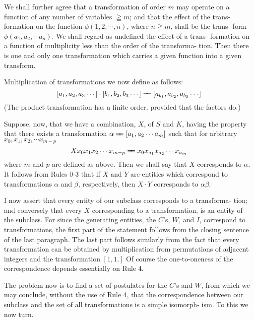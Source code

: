 \documentclass[10pt, twoside]{extarticle}
\def\varequals#1{\mathrel{\leaders\hbox to3pt{$=$\hss}\hskip#1=}}
\newcommand\longeq{\varequals{0.4em}}
\theoremstyle{breaktheorem}
\theoremstyle{mylemma}
\theoremstyle{mydefinition}
\theoremstyle{mycorollary}
\begin{document}
We shall further agree that a transformation of order \(m\) may operate on
a function of any number of variables \(\geqq m\); and that the effect of the trans-
formation on the function \(\phi(1, 2, \cdots, n)\), where \(n \geqq m\), shall be the trans-
form \(\phi(a_1, a_2, \cdots a_n)\). We shall regard as undefined the effect of a trans-
formation on a function of multiplicity less than the order of the transforma-
tion. Then there is one and only one transformation which carries a given
function into a given transform.

Multiplication of transformations we now define as follows:
\begin{equation}
  \label{eq:multiplication_transformations}
[a_1, a_2, a_3 \cdots] \cdot [b_1, b_2, b_3 \cdots] \longeq [a_{b_1}, a_{b_2}, a_{b_3} \cdots]
\end{equation}
(The product transformation has a finite order, provided that the factors do.)

Suppose, now, that we have a combination, \(X\), of \(S\) and \(K\), having the
property that there exists a transformation \(\alpha \longeq [a_1, a_2 \cdots a_m]\) such that for
arbitrary \(x_0, x_1, x_2, \cdots x_{m-p}\)
\[Xx_0 x_1 x_2 \cdots x_{m-p} \longeq x_0 x_{a_1}x_{a_2} \cdots x_{a_m}\]
where \(m\) and \(p\) are defined as above. Then we shall say that \(X\) corresponds to
\(\alpha\). It follows from Rules 0-3 that if \(X\) and \(Y\) are entities which correspond to
transformations \(\alpha\) and \(\beta\), respectively, then \(X \cdot Y\) corresponds to \(\alpha\beta\).

I now assert that every entity of our subclass corresponds to a transforma-
tion; and conversely that every \(X\) corresponding to a transformation, is an
entity of the subclass. For since the generating entities, the \(C\)'s, \(W\), and \(I\),
correspond to transformations, the first part of the statement follows from the
closing sentence of the last paragraph. The last part follows similarly from
the fact that every transformation can be obtained by multiplication from
permutations of adjacent integers and the transformation \([1, 1.]\) Of course
the one-to-oneness of the correspondence depends essentially on Rule 4.

The problem now is to find a set of postulates for the \(C\)'s and \(W\), from
which we may conclude, without the use of Rule 4, that the correspondence
between our subclass and the set of all transformations is a simple isomorph-
ism. To this we now turn.
\end{document}
